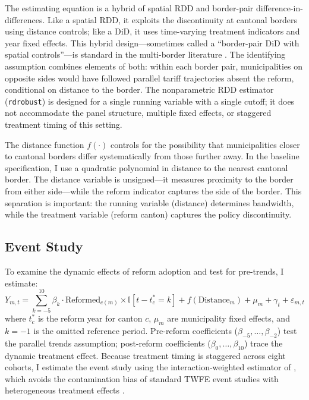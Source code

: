 \documentclass[12pt]{article}
\newcommand{\ind}{\mathbb{I}}
\begin{document}
The estimating equation is a hybrid of spatial RDD and border-pair difference-in-differences. Like a spatial RDD, it exploits the discontinuity at cantonal borders using distance controls; like a DiD, it uses time-varying treatment indicators and year fixed effects. This hybrid design---sometimes called a ``border-pair DiD with spatial controls''---is standard in the multi-border literature \citep{eugster2011demand, egger2015causal}. The identifying assumption combines elements of both: within each border pair, municipalities on opposite sides would have followed parallel tariff trajectories absent the reform, conditional on distance to the border. The nonparametric RDD estimator (\texttt{rdrobust}) is designed for a single running variable with a single cutoff; it does not accommodate the panel structure, multiple fixed effects, or staggered treatment timing of this setting.

The distance function $f(\cdot)$ controls for the possibility that municipalities closer to cantonal borders differ systematically from those further away. In the baseline specification, I use a quadratic polynomial in distance to the nearest cantonal border. The distance variable is unsigned---it measures proximity to the border from either side---while the reform indicator captures the side of the border. This separation is important: the running variable (distance) determines bandwidth, while the treatment variable (reform canton) captures the policy discontinuity.

\subsection{Event Study}

To examine the dynamic effects of reform adoption and test for pre-trends, I estimate:
\begin{equation}
Y_{m,t} = \sum_{k=-5}^{10} \beta_k \cdot \text{Reformed}_{c(m)} \times \ind[t - t^*_{c} = k] + f(\text{Distance}_{m}) + \mu_m + \gamma_t + \varepsilon_{m,t}
\label{eq:es}
\end{equation}
where $t^*_c$ is the reform year for canton $c$, $\mu_m$ are municipality fixed effects, and $k = -1$ is the omitted reference period. Pre-reform coefficients ($\beta_{-5}, \ldots, \beta_{-2}$) test the parallel trends assumption; post-reform coefficients ($\beta_0, \ldots, \beta_{10}$) trace the dynamic treatment effect. Because treatment timing is staggered across eight cohorts, I estimate the event study using the interaction-weighted estimator of \citet{sun2021estimating}, which avoids the contamination bias of standard TWFE event studies with heterogeneous treatment effects \citep[see also][]{callaway2021difference}.
\end{document}
